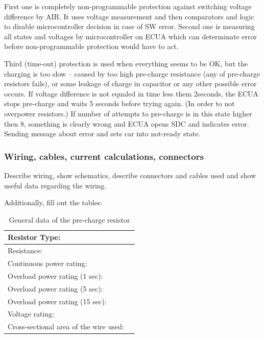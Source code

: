 First one is completely non-programmable protection against switching voltage difference by AIR. It uses voltage measurement and then comparators and logic to disable microcontroller decision in case of SW error.
Second one is measuring all states and voltages by microcontroller on ECUA which can determinate error before non-programmable protection would have to act.

Third (time-out) protection is used when everything seems to be OK, but the charging is too slow – caused by too high pre-charge resistance (any of pre-charge resistors fails), or some leakage of charge in capacitor or any other possible error occurs. If voltage difference is not equaled in time less them 2seconds, the ECUA stops pre-charge and waits 5 seconds before trying again. (In order to not overpower resistors.) If number of attempts to pre-charge is in this state higher then 8, something is clearly wrong and ECUA opens SDC and indicates error. Sending message about error and sets car into not-ready state.

\subsubsection{Wiring, cables, current calculations, connectors}
Describe wiring, show schematics, describe connectors and cables used and show useful data regarding the wiring.



Additionally, fill out the tables:

\begin{table}[H]
	\centering
	\caption{General data of the pre-charge resistor}
	\begin{tabularx}{\textwidth}{|X|X|}
		\hline
		Resistor Type: & \\[\TableSize]
		\hline
		Resistance: & \\[\TableSize]
		\hline
		Continuous power rating: & \\[\TableSize]
		\hline
		Overload power rating (1 sec): &  \\[\TableSize]
		\hline
		Overload power rating (5 sec): &  \\[\TableSize]
		\hline
		Overload power rating (15 sec): &  \\[\TableSize]
		\hline
		Voltage rating: & \\[\TableSize]
		\hline
		Cross-sectional area of the wire used: & \\[\TableSize]
		\hline
	\end{tabularx}%
	\label{tab:precharge-general}%
\end{table}%

